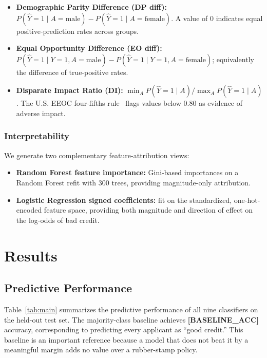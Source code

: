 \documentclass[conference]{IEEEtran}
\begin{document}
\begin{itemize}
    \item \textbf{Demographic Parity Difference (DP diff):} $P(\hat{Y}=1 \mid A=\text{male}) - P(\hat{Y}=1 \mid A=\text{female})$. A value of 0 indicates equal positive-prediction rates across groups.
    \item \textbf{Equal Opportunity Difference (EO diff):} $P(\hat{Y}=1 \mid Y=1, A=\text{male}) - P(\hat{Y}=1 \mid Y=1, A=\text{female})$; equivalently the difference of true-positive rates.
    \item \textbf{Disparate Impact Ratio (DI):} $\min_A P(\hat{Y}=1 \mid A) / \max_A P(\hat{Y}=1 \mid A)$. The U.S. EEOC four-fifths rule~\cite{fourfifths} flags values below 0.80 as evidence of adverse impact.
\end{itemize}

\subsubsection{Interpretability}
We generate two complementary feature-attribution views:
\begin{itemize}
    \item \textbf{Random Forest feature importance:} Gini-based importances on a Random Forest refit with 300 trees, providing magnitude-only attribution.
    \item \textbf{Logistic Regression signed coefficients:} fit on the standardized, one-hot-encoded feature space, providing both magnitude and direction of effect on the log-odds of bad credit.
\end{itemize}

\section{Results}\label{sec:results}

\subsection{Predictive Performance}

Table~\ref{tab:main} summarizes the predictive performance of all nine classifiers on the held-out test set. The majority-class baseline achieves \textbf{[BASELINE_ACC]} accuracy, corresponding to predicting every applicant as ``good credit.'' This baseline is an important reference because a model that does not beat it by a meaningful margin adds no value over a rubber-stamp policy.
\end{document}
